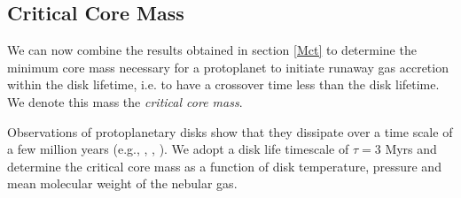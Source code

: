 \documentclass[apj]{emulateapj}
\begin{document}





\subsection{Critical Core Mass}
\label{critcore}

We can now combine the results obtained in section \ref{Mct} to determine the minimum core mass necessary for a protoplanet to initiate runaway gas accretion within the disk lifetime, i.e. to have a crossover time less than the disk lifetime. We  denote this mass the \textit{critical core mass}.


Observations of protoplanetary disks show that they dissipate over a time scale of a few million years (e.g., \citealt{lagrange00}, \citealt{haisch01}, \citealt{goldreich04}). We adopt a disk life timescale of $\tau=3 $ Myrs and determine the critical core mass as a function of disk temperature, pressure and mean molecular weight of the nebular gas. 
\end{document}
